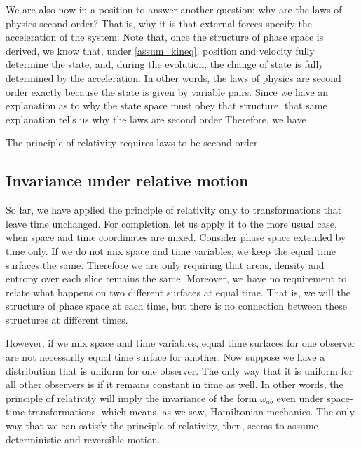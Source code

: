 We are also now in a position to answer another question: why are the laws of physics second order? That is, why it is that external forces specify the acceleration of the system. Note that, once the structure of phase space is derived, we know that, under \ref{assum_kineq}, position and velocity fully determine the state, and, during the evolution, the change of state is fully determined by the acceleration. In other words, the laws of physics are second order exactly because the state is given by variable pairs. Since we have an explanation as to why the state space must obey that structure, that same explanation tells us why the laws are second order Therefore, we have
\begin{insight}
	The principle of relativity requires laws to be second order.
\end{insight}


\subsection{Invariance under relative motion}

So far, we have applied the principle of relativity only to transformations that leave time unchanged. For completion, let us apply it to the more usual case, when space and time coordinates are mixed. Consider phase space extended by time only. If we do not mix space and time variables, we keep the equal time surfaces the same. Therefore we are only requiring that areas, density and entropy over each slice remains the same. Moreover, we have no requirement to relate what happens on two different surfaces at equal time. That is, we will the structure of phase space at each time, but there is no connection between these structures at different times.

However, if we mix space and time variables, equal time surfaces for one observer are not necessarily equal time surface for another. Now suppose we have a distribution that is uniform for one observer. The only way that it is uniform for all other observers is if it remains constant in time as well. In other words, the principle of relativity will imply the invariance of the form $\omega_{ab}$ even under space-time transformations, which means, as we saw, Hamiltonian mechanics. The only way that we can satisfy the principle of relativity, then, seems to assume deterministic and reversible motion.

